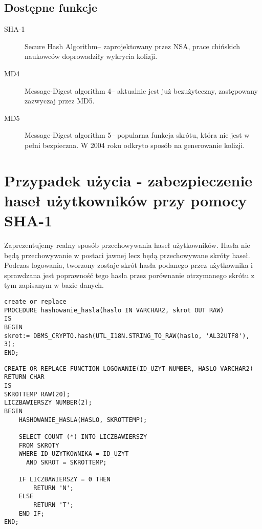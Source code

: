 \documentclass[12pt, a4paper]{article}
\begin{document}
\subsection{Dostępne funkcje}
\begin{description}
\item[SHA-1]Secure Hash Algorithm-- zaprojektowany przez NSA, prace chińskich naukowców doprowadziły wykrycia kolizji.
\item[MD4] Message-Digest algorithm 4-- aktualnie jest już bezużyteczny, zastępowany zazwyczaj przez MD5.
\item[MD5] Message-Digest algorithm 5-- popularna funkcja skrótu, która nie jest w pełni bezpieczna. W 2004 roku odkryto sposób na generowanie kolizji.
\end{description}

\section{Przypadek użycia - zabezpieczenie haseł użytkowników przy pomocy
\mbox{SHA-1}}
 Zaprezentujemy realny sposób przechowywania haseł użytkowników. Hasła nie będą
 przechowywanie w postaci jawnej lecz będą przechowywane skróty haseł. Podczas
 logowania, tworzony zostaje skrót hasła podanego przez użytkownika i sprawdzana
 jest poprawność tego hasła przez porównanie otrzymanego skrótu z tym zapisanym
 w bazie danych.
 
\begin{lstlisting}
create or replace
PROCEDURE hashowanie_hasla(haslo IN VARCHAR2, skrot OUT RAW)
IS
BEGIN
skrot:= DBMS_CRYPTO.hash(UTL_I18N.STRING_TO_RAW(haslo, 'AL32UTF8'), 3);
END;
\end{lstlisting}


\begin{lstlisting}
CREATE OR REPLACE FUNCTION LOGOWANIE(ID_UZYT NUMBER, HASLO VARCHAR2) RETURN CHAR
IS
SKROTTEMP RAW(20);
LICZBAWIERSZY NUMBER(2);
BEGIN
	HASHOWANIE_HASLA(HASLO, SKROTTEMP);

	SELECT COUNT (*) INTO LICZBAWIERSZY
	FROM SKROTY
	WHERE ID_UZYTKOWNIKA = ID_UZYT
      AND SKROT = SKROTTEMP;
      
	IF LICZBAWIERSZY = 0 THEN 
		RETURN 'N';
	ELSE
		RETURN 'T';
	END IF;
END;
\end{lstlisting}
 
\end{document}
